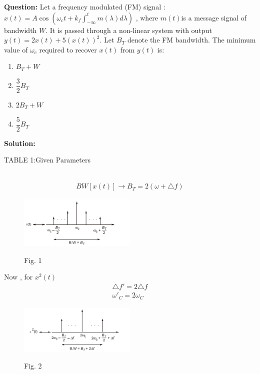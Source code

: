 \documentclass[journal,12pt,twocolumn]{IEEEtran}
\theoremstyle{remark}
\begin{document}
\textbf{Question:} Let a frequency modulated (FM) signal : $ x(t) = A \cos(\omega_c t + k_f \int_{-\infty}^{t} m(\lambda) d\lambda)$ , where $ m(t) $is a message signal of bandwidth $ W $. It is passed through a non-linear system with output $y(t) = 2x(t) + 5(x(t))^2 $.
Let $B_T $ denote the FM bandwidth. The minimum value of $ \omega_c $ required to recover $ x(t) $ from $ y(t) $ is:\\
\begin{enumerate}[label = (\Alph*)]
\item $B_T + W$ \\
\item $\dfrac{3}{2} B_T$ \\
\item $2B_T + W$ \\
\item $\dfrac{5}{2} B_T$ \\
\end{enumerate}
\textbf{Solution: }
\begin{table}[h!]
\centering
\resizebox{\columnwidth}{!}{
}
\label{cggattab1}
\caption*{ TABLE 1:Given Parameters}
\end{table}
\\
\begin{align}
BW[x(t)] \longrightarrow B_T = 2(\omega + \triangle f )
\end{align}
\begin{figure}[h!]
  \centering
  \includegraphics[width=0.5\textwidth]{figures/cggatefig1.png} 
 \label{cggatefig1}
 \caption*{Fig. 1}
\end{figure}

Now , for $x^{2}(t) $
\begin{align}
\triangle f' = 2\triangle f \\
\omega'_C = 2\omega_C
\end{align}

\begin{figure}[h!]
  \centering
  \includegraphics[width=0.5\textwidth]{figures/cggatefig2.png} 
 \label{cggatefig2}
  \caption*{Fig. 2}
\end{figure}
\end{document}
